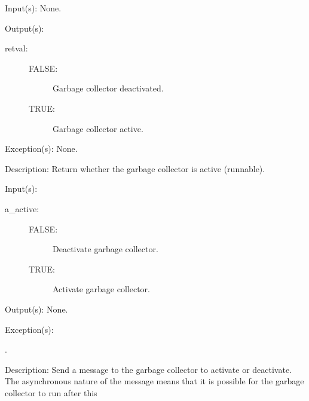 \begin{capi}
\begin{capilist}
	\end{capilist}
\label{nxa_active_get}
	\begin{capilist}
	\item[Input(s): ] None.
	\item[Output(s): ]
		\begin{description}\item[]
		\item[retval: ]
			\begin{description}\item[]
			\item[FALSE: ]
				Garbage collector deactivated.
			\item[TRUE: ]
				Garbage collector active.
			\end{description}
		\end{description}
	\item[Exception(s): ] None.
	\item[Description: ]
		Return whether the garbage collector is active (runnable).
	\end{capilist}
\label{nxa_active_set}
	\begin{capilist}
	\item[Input(s): ]
		\begin{description}\item[]
		\item[a\_active: ]
			\begin{description}\item[]
			\item[FALSE: ]
				Deactivate garbage collector.
			\item[TRUE: ]
				Activate garbage collector.
			\end{description}
		\end{description}
	\item[Output(s): ] None.
	\item[Exception(s): ]
		\begin{description}\item[]
		\item[.]
		\end{description}
	\item[Description: ]
		Send a message to the garbage collector to activate or
		deactivate.  The asynchronous nature of the message means that
		it is possible for the garbage collector to run after this

\end{capilist}
\end{capi}
